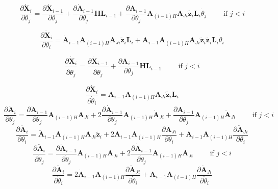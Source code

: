 \documentclass{article}
\begin{document}
\begin{equation}
\frac{\partial \dot{\mathbf X}_i}{\partial \theta_j}=
\frac{\partial \dot{\mathbf X}_{i-1}}{\partial \theta_j}+\frac{\partial \dot{\mathbf A}_{i-1}}{\partial \theta_j}\mathbf{HL}_{i-1}+\frac{\partial \mathbf{A}_{i-1}}{\partial \theta_j}\mathbf{A}_{(i-1)H}\mathbf{A}_{Ji}\tilde{\mathbf z}_i\mathbf{L}_i\dot{\theta}_j
	\qquad \textrm{  if  } j < i
\end{equation}

\begin{equation}
\frac{\partial \dot{\mathbf X}_i}{\partial \theta_i}=\dot{\mathbf A}_{i-1}\mathbf{A}_{(i-1)H}\mathbf{A}_{Ji}\tilde{\mathbf z}_i{\mathbf L}_i+\mathbf{A}_{i-1}{\mathbf A}_{(i-1)H}\mathbf{A}_{Ji}\tilde{\mathbf z}_i\tilde{\mathbf z}_i{\mathbf L}_i\dot{\theta}_i
\end{equation}

\begin{equation}
\frac{\partial \dot{\mathbf X}_i}{\partial \dot{\theta}_j}= 
\frac{\partial \dot{\mathbf X}_{i-1}}{\partial \dot{\theta}_j}+\frac{\partial \mathbf{A}_{i-1}}{\partial \theta_j}\mathbf{HL}_{i-1} 
	\qquad \textrm{  if  } j < i
\end{equation}

\begin{equation}
\frac{\partial \dot{\mathbf X}_i}{\partial \dot{\theta}_i}= 
\mathbf{A}_{i-1}\mathbf{A}_{(i-1)H}\mathbf{A}_{Ji}\tilde{\mathbf z}_i\mathbf{L}_i
\end{equation}
\begin{equation}
\frac{\partial \mathbf{\ddot A}_i}{\partial \theta_j}=
\frac{\partial \mathbf{\ddot A}_{i-1}}{\partial \theta_j}\mathbf{A}_{(i-1)H}\mathbf{A}_{Ji}+
2\frac{\partial \mathbf{\dot A}_{i-1}}{\partial \theta_j}\mathbf{A}_{(i-1)H}\mathbf{\dot A}_{Ji}+
\frac{\partial \mathbf{A}_{i-1}}{\partial \theta_j}\mathbf{A}_{(i-1)H}\mathbf{\ddot A}_{Ji}
	\qquad \textrm{  if  } j < i
\end{equation}
\begin{equation}
\frac{\partial \mathbf{\ddot A}_i}{\partial \theta_i}=
\mathbf{\ddot A}_{i-1}\mathbf{A}_{(i-1)H}\mathbf{A}_{Ji}\tilde{\mathbf z}_i+
2\mathbf{\dot A}_{i-1}\mathbf{A}_{(i-1)H}\frac{\partial \mathbf{\dot A}_{Ji}}{\partial \theta_i}+
\mathbf{A}_{i-1}\mathbf{A}_{(i-1)H}\frac{\partial \mathbf{\ddot A}_{Ji}}{\partial \theta_i}
\end{equation}
\begin{equation}
\frac{\partial \mathbf{\ddot A}_i}{\partial \dot{\theta}_j}=
\frac{\partial \mathbf{\ddot A}_{i-1}}{\partial \dot{\theta}_j}\mathbf{A}_{(i-1)H}\mathbf{A}_{Ji}+
2\frac{\partial \mathbf{\dot A}_{i-1}}{\partial \dot{\theta}_j}\mathbf{A}_{(i-1)H}\mathbf{\dot A}_{Ji}
	\qquad \textrm{  if  } j < i
\end{equation}
\begin{equation}
\frac{\partial \mathbf{\ddot A}_i}{\partial \dot{\theta}_i}=
2\mathbf{\dot A}_{i-1}\mathbf{A}_{(i-1)H}\frac{\partial \mathbf{\dot A}_{Ji}}{\partial \dot{\theta}_i}+
\mathbf{A}_{i-1}\mathbf{A}_{(i-1)H}\frac{\partial \mathbf{\ddot A}_{Ji}}{\partial \dot{\theta}_i}
\end{equation}
\end{document}
